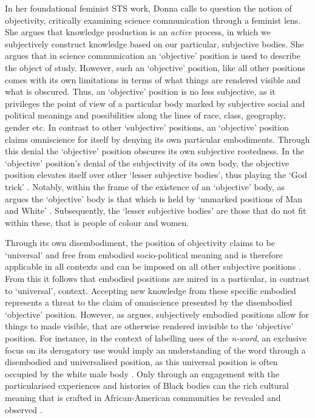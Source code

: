 In her foundational feminist STS work, Donna \citet{Haraway:1988} calls to question the notion of objectivity, critically examining science communication through a feminist lens.
She argues that knowledge production is an \textit{active} process, in which we subjectively construct knowledge based on our particular, subjective bodies.
She argues that in science communication an `objective' position is used to describe the object of study.
However, such an `objective' position, like all other positions comes with its own limitations in terms of what things are rendered visible and what is obscured.
Thus, an `objective' position is no less subjective, as it privileges the point of view of a particular body marked by subjective social and political meanings and possibilities along the lines of race, class, geography, gender etc. 
In contrast to other `subjective' positions, an `objective' position claims omniscience for itself by denying its own particular embodiments.
Through this denial the `objective' position obscures its own subjective rootedness.
In the `objective' position's denial of the subjectivity of its own body, the objective position elevates itself over other `lesser subjective bodies', thus playing the `God trick' \citep{Haraway:1988}.
Notably, within the frame of the existence of an `objective' body, as \citet{Haraway:1988} argues the `objective' body is that which is held by `unmarked positions of Man and White' \cite[p. 8]{Haraway:1988}.
Subsequently, the `lesser subjective bodies' are those that do not fit within these, that is people of colour and women.

Through its own disembodiment, the position of objectivity claims to be `universal' and free from embodied socio-political meaning and is therefore applicable in all contexts and can be imposed on all other subjective positions \citep{Mohanty:1984}.
From this it follows that embodied positions are mired in a particular, in contrast to `universal', context.
Accepting new knowledge from these specific embodied represents a threat to the claim of omniscience presented by the disembodied `objective' position.
However, as \citet{Haraway:1988} argues, subjectively embodied positions allow for things to made visible, that are otherwise rendered invisible to the `objective' position.
For instance, in the context of labelling uses of the \textit{n-word}, an exclusive focus on its derogatory use would imply an understanding of the word through a disembodied and universalised position, as this universal position is often occupied by the white male body \citep{Haraway:1988}.
Only through an engagement with the particularised experiences and histories of Black bodies can the rich cultural meaning that is crafted in African-American communities be revealed and observed \citep{Rahman:2012}.


